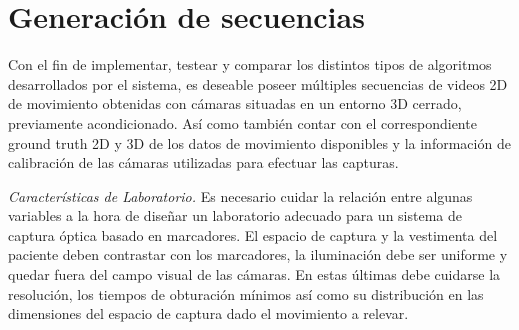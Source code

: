 \section{Generación de secuencias} 
\label{section_base_de_datos}
Con el fin de implementar, testear y comparar los distintos tipos de algoritmos desarrollados por el sistema, es deseable poseer  múltiples secuencias de videos 2D de movimiento obtenidas
con cámaras situadas en un entorno 3D cerrado, previamente acondicionado. Así como también contar con el correspondiente ground truth 2D y 3D de los datos de movimiento disponibles y la información de calibración de las cámaras utilizadas para efectuar las capturas.

\textit{Características de Laboratorio.}
\label{seccion_Caracteristicas_Laboratorio}
Es necesario cuidar la relación entre algunas variables a la hora de diseñar un laboratorio adecuado para un sistema de captura óptica basado en marcadores. El espacio de captura y la vestimenta del paciente deben contrastar con los marcadores, la iluminación debe ser uniforme y quedar fuera del campo visual de las cámaras. En estas últimas debe cuidarse la resolución, los tiempos de obturación mínimos así como su distribución en las dimensiones del espacio de captura dado el movimiento a relevar.
%

